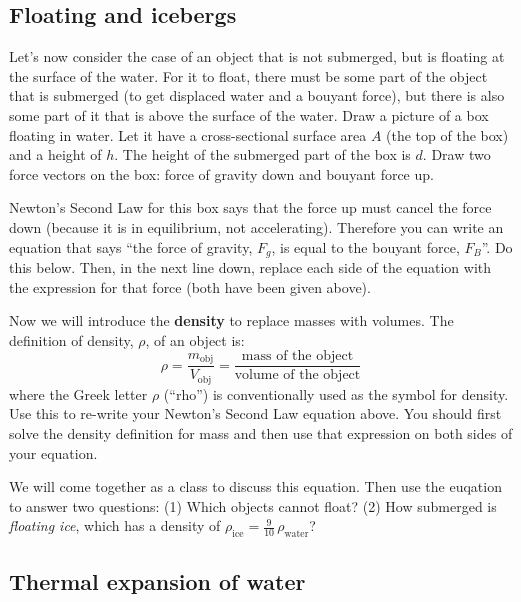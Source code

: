 \answerspace

\subsection{Floating and icebergs}

Let's now consider the case of an object that is not submerged, but is floating at the surface of the water.  For it to float, there must be some part of the object that is submerged (to get displaced water and a bouyant force), but there is also some part of it that is above the surface of the water.  Draw a picture of a box floating in water. Let it have a cross-sectional surface area  $A$ (the top of the box) and a height of $h$.  The height of the submerged part of the box is $d$.  Draw two force vectors on the box: force of gravity down and bouyant force up.  

\answerspace

\noindent Newton's Second Law for this box says that the force up must cancel the force down (because it is in equilibrium,  not accelerating).  Therefore you can write an equation that says ``the force of gravity, $F_g$, is equal to the bouyant force, $F_B$''.  Do this below. Then, in the next line down, replace each side of the equation with the expression for that force (both have been given above).

\answerspace

\noindent Now we will introduce the {\bf density} to replace masses with volumes.  The definition of density, $\rho$, of an object is:
	\begin{equation*}
	\rho = \frac{m_\text{obj}}{V_\text{obj}} = \frac{\text{mass of the object}}{\text{volume of the object}}
	\end{equation*}
where the Greek letter $\rho$ (``rho'') is conventionally used as the symbol for density.  Use this to re-write your Newton's Second Law equation above.  You should first solve the density definition for mass and then use that expression on both sides of your equation.

\answerspace

\noindent We will come together as a class to discuss this equation.  Then use the euqation to answer two questions: (1) Which objects cannot float?  (2) How submerged is  {\em floating ice}, which has a density of $\rho_\text{ice} = \frac{9}{10} \,\rho_\text{water}$?

\answerspace

\subsection{Thermal expansion of water}

